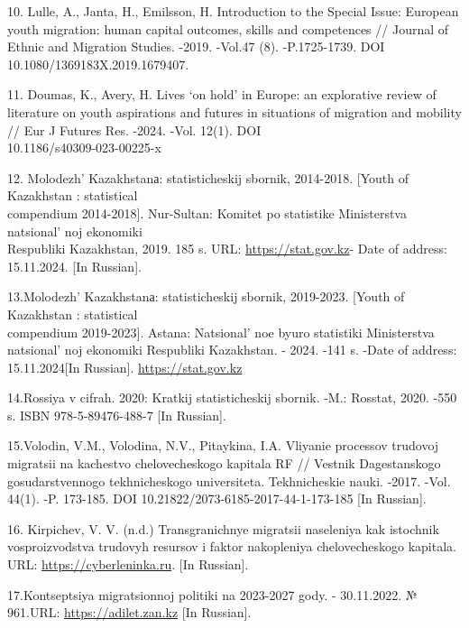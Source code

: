 \begin{references}
10. Lulle, A., Janta, H., Emilsson, H. Introduction to the Special
Issue: European youth migration: human capital outcomes, skills and
competences // Journal of Ethnic and Migration Studies. -2019. -Vol.47
(8). -P.1725-1739. DOI 10.1080/1369183X.2019.1679407.

11. Doumas, K., Avery, H. Lives `on hold' in Europe: an explorative
review of literature on youth aspirations and futures in situations of
migration and mobility // Eur J Futures Res. -2024. -Vol. 12(1). DOI\\
10.1186/s40309-023-00225-x

12. Molodezh'{} Kazakhstanа: statisticheskij sbornik,
2014-2018. {[}Youth of Kazakhstan : statistical \\compendium 2014-2018{]}.
Nur-Sultan: Komitet po statistike Ministerstva
natsional' noj ekonomiki \\Respubliki Kazakhstan, 2019. 185
s. URL: \href{https://stat.gov.kz/api/iblock/element/184021/file/ru/}{https://stat.gov.kz}-
Date of address: 15.11.2024. {[}In Russian{]}.

13.Molodezh'{} Kazakhstanа: statisticheskij sbornik,
2019-2023. {[}Youth of Kazakhstan : statistical \\compendium 2019-2023{]}.
Astana: Natsional' noe byuro statistiki Ministerstva
natsional' noj ekonomiki Respubliki Kazakhstan. - 2024.
-141 s. -Date of address: 15.11.2024{[}In Russian{]}.
\href{https://stat.gov.kz/api/iblock/element/184021/file/ru/}{https://stat.gov.kz}

14.Rossiya v cifrah. 2020: Kratkij statisticheskij sbornik. -M.:
Rosstat, 2020. -550 s. ISBN 978-5-89476-488-7 {[}In Russian{]}.

15.Volodin, V.M., Volodina, N.V., Pitaykina, I.A. Vliyanie processov
trudovoj migratsii na kachestvo chelovecheskogo kapitala RF // Vestnik
Dagestanskogo gosudarstvennogo tekhnicheskogo universiteta.
Tekhnicheskie nauki. -2017. -Vol. 44(1). -P. 173-185. DOI
10.21822/2073-6185-2017-44-1-173-185 {[}In Russian{]}.

16. Kirpichev, V. V. (n.d.) Transgranichnye migratsii naseleniya kak
istochnik vosproizvodstva trudovyh resursov i faktor nakopleniya
chelovecheskogo kapitala. URL:
\href{https://cyberleninka.ru/article/n/transgranichnye-migratsii-naseleniya-kak-istochnik-vosproizvodstva-trudovyh-resursov-i-faktor-nakopleniya-chelovecheskogo-kapitala}{https://cyberleninka.ru}.
{[}In Russian{]}.

17.Kontseptsiya migratsionnoj politiki na 2023-2027 gody. - 30.11.2022.
№ 961.URL:
\href{https://adilet.zan.kz/rus/docs/P2200000961}{https://adilet.zan.kz} {[}In Russian{]}.
\end{references}

